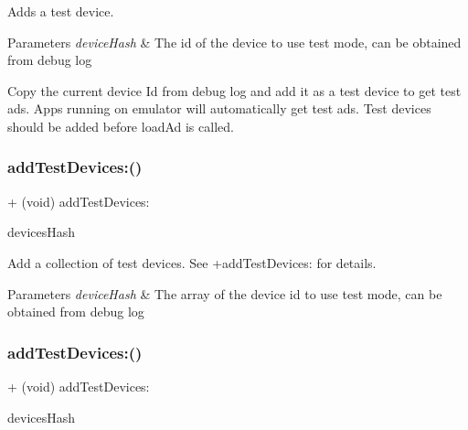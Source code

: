 Adds a test device.


\begin{DoxyParams}{Parameters}
{\em device\+Hash} & The id of the device to use test mode, can be obtained from debug log\\
\hline
\end{DoxyParams}
Copy the current device Id from debug log and add it as a test device to get test ads. Apps running on emulator will automatically get test ads. Test devices should be added before load\+Ad is called. \mbox{\label{interfaceFBAdSettings_aef0e9decab562f63ecadc72dbb594a56}} 
\subsubsection{\texorpdfstring{add\+Test\+Devices\+:()}{addTestDevices:()}\hspace{0.1cm}{\footnotesize\ttfamily [1/5]}}
{\footnotesize\ttfamily + (void) add\+Test\+Devices\+: \begin{DoxyParamCaption}\item[{(N\+S\+Array $\ast$)}]{devices\+Hash }\end{DoxyParamCaption}}

Add a collection of test devices. See {\ttfamily +add\+Test\+Devices\+:} for details.


\begin{DoxyParams}{Parameters}
{\em device\+Hash} & The array of the device id to use test mode, can be obtained from debug log \\
\hline
\end{DoxyParams}
\mbox{\label{interfaceFBAdSettings_aef0e9decab562f63ecadc72dbb594a56}} 
\subsubsection{\texorpdfstring{add\+Test\+Devices\+:()}{addTestDevices:()}\hspace{0.1cm}{\footnotesize\ttfamily [2/5]}}
{\footnotesize\ttfamily + (void) add\+Test\+Devices\+: \begin{DoxyParamCaption}\item[{(N\+S\+Array $\ast$)}]{devices\+Hash }\end{DoxyParamCaption}}

